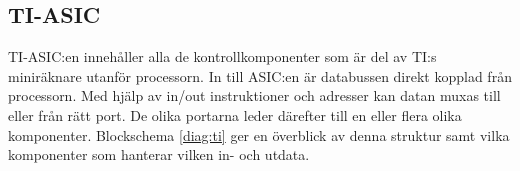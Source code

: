 \documentclass[main.tex]{subfiles}
\begin{document}
\subsection{TI-ASIC}
TI-ASIC:en innehåller alla de kontrollkomponenter som är del av TI:s
miniräknare utanför processorn. In till ASIC:en är databussen direkt kopplad
från processorn. Med hjälp av in/out instruktioner och adresser kan datan muxas
till eller från rätt port. De olika portarna leder därefter till en eller flera
olika komponenter. Blockschema \ref{diag:ti} ger en överblick av denna struktur
samt vilka komponenter som hanterar vilken in- och utdata.





\end{document}
